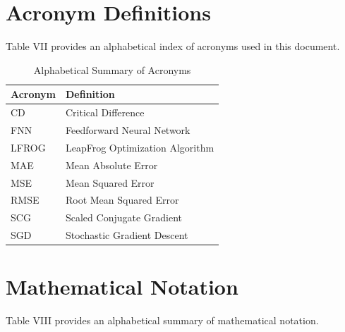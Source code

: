 \documentclass[10pt, conference]{IEEEtran}
\begin{document}
\appendices

\section{Acronym Definitions}

Table VII provides an alphabetical index of acronyms used in this document.

\begin{table}[t]
\caption{Alphabetical Summary of Acronyms}
\label{tab:acronyms}
\centering
\begin{tabular}{ll}
\toprule
Acronym & Definition \\
\midrule
CD & Critical Difference \\
FNN & Feedforward Neural Network \\
LFROG & LeapFrog Optimization Algorithm \\
MAE & Mean Absolute Error \\
MSE & Mean Squared Error \\
RMSE & Root Mean Squared Error \\
SCG & Scaled Conjugate Gradient \\
SGD & Stochastic Gradient Descent \\
\bottomrule
\end{tabular}
\end{table}

\section{Mathematical Notation}

Table VIII provides an alphabetical summary of mathematical notation.
\end{document}
